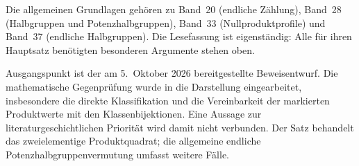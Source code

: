 \documentclass[a4paper,11pt]{article}
\begin{document}
Die allgemeinen Grundlagen gehören zu Band~20 (endliche Zählung),
Band~28 (Halbgruppen und Potenzhalbgruppen), Band~33 (Nullproduktprofile)
und Band~37 (endliche Halbgruppen). Die Lesefassung ist eigenständig:
Alle für ihren Hauptsatz benötigten besonderen Argumente stehen oben.

Ausgangspunkt ist der am 5.~Oktober 2026 bereitgestellte Beweisentwurf.
Die mathematische Gegenprüfung wurde in die Darstellung eingearbeitet,
insbesondere die direkte Klassifikation und die Vereinbarkeit der
markierten Produktwerte mit den Klassenbijektionen. Eine Aussage zur
literaturgeschichtlichen Priorität wird damit nicht verbunden. Der Satz
behandelt das zweielementige Produktquadrat; die allgemeine endliche
Potenzhalbgruppenvermutung umfasst weitere Fälle.
\end{document}
